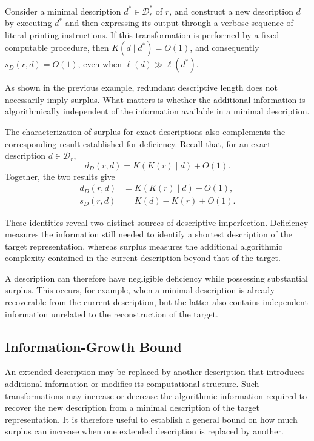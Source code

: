 \begin{example}
Consider a minimal description $d^\ast\in\mathcal D_r^\ast$ of $r$, and construct a new description $d$ by executing $d^\ast$ and then expressing its output through a verbose sequence of literal printing instructions. If this transformation is performed by a fixed computable procedure, then $K(d\mid d^\ast)=O(1)$, and consequently $s_D(r,d)=O(1)$, even when $\ell(d) \gg \ell(d^\ast)$.
\end{example}

As shown in the previous example, redundant descriptive length does not necessarily imply surplus. What matters is whether the additional information is algorithmically independent of the information available in a minimal description.

The characterization of surplus for exact descriptions also complements the corresponding result established for deficiency. Recall that, for an exact description $d\in\bar{\mathcal D}_r$,
\[
d_D(r,d) = K(K(r)\mid d)+O(1).
\]
Together, the two results give
\[
\begin{aligned}
d_D(r,d)
& = K(K(r)\mid d) + O(1),\\
s_D(r,d)
& = K(d)-K(r)+O(1).
\end{aligned}
\]

These identities reveal two distinct sources of descriptive imperfection. Deficiency measures the information still needed to identify a shortest description of the target representation, whereas surplus measures the additional algorithmic complexity contained in the current description beyond that of the target.

A description can therefore have negligible deficiency while possessing substantial surplus. This occurs, for example, when a minimal description is already recoverable from the current description, but the latter also contains independent information unrelated to the reconstruction of the target.


\subsection*{Information-Growth Bound}

An extended description may be replaced by another description that introduces additional information or modifies its computational structure. Such transformations may increase or decrease the algorithmic information required to recover the new description from a minimal description of the target representation. It is therefore useful to establish a general bound on how much surplus can increase when one extended description is replaced by another.

